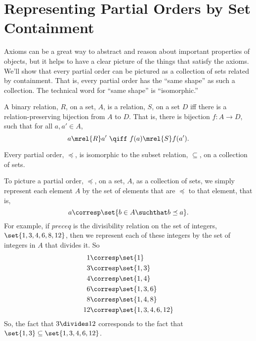 \begin{problems}
\classproblems
{}

\end{problems}

\section{Representing Partial Orders by Set Containment}

Axioms can be a great way to abstract and reason about important
properties of objects, but it helps to have a clear picture of the things
that satisfy the axioms.  We'll show that every partial order can be
pictured as a collection of sets related by containment.  That is, every
partial order has the ``same shape'' as such a collection.  The technical
word for ``same shape'' is ``isomorphic.''

\begin{definition}\label{relation-isomorphism}
  A binary relation, $R$, on a set, $A$, is
   a relation, $S$, on a set $D$ iff there is a
  relation-preserving bijection from $A$ to $D$.  That is, there is
  bijection $f:A \to D$, such that for all $a,a' \in A$,
  \[
  a \mrel{R} a'\ \qiff\ f(a) \mrel{S} f(a').
  \]
\end{definition}

\begin{theorem}
Every partial order, $\preceq$, is isomorphic to the subset relation,
$\subseteq$, on a collection of sets.
\end{theorem}

To picture a partial order, $\preceq$, on a set, $A$, as a collection of
sets, we simply represent each element $A$ by the set of elements
that are $\preceq$ to that element, that is,
\[
a \corresp \set{b \in A \suchthat b \preceq a}.
\]
For example, if $preceq$ is the divisibility relation on the set of
integers, $\set{1,3,4,6,8,12}$, then we represent each of these integers
by the set of integers in $A$ that divides it.  So
\begin{align*}
1 & \corresp \set{1}\\
3 & \corresp \set{1,3}\\
4 & \corresp \set{1,4}\\
6 & \corresp \set{1,3,6}\\
8 & \corresp \set{1,4,8}\\
12 & \corresp \set{1,3,4,6, 12}
\end{align*}
So, the fact that $3 \divides 12$ corresponds to the fact that $\set{1,3}
\subseteq \set{1,3,4,6, 12}$.

